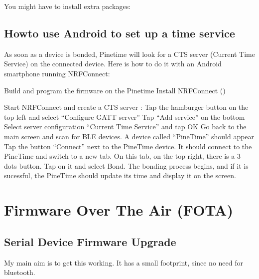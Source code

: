 \documentclass[letterpaper,10pt,english]{sphinxmanual}
\begin{document}
You might have to install extra packages:

\begin{sphinxVerbatim}[commandchars=\\\{\}]
\end{sphinxVerbatim}


\section{Howto use Android to set up a time service}
\label{\detokenize{current-time:howto-use-android-to-set-up-a-time-service}}
As soon as a device is bonded, Pinetime will look for a CTS server (Current Time Service) on the connected device.
Here is how to do it with an Android smartphone running NRFConnect:

Build and program the firmware on the Pinetime Install NRFConnect ()

Start NRFConnect and create a CTS server : Tap the hamburger button on the top left and select “Configure GATT server” Tap “Add service” on the bottom Select server configuration “Current Time Service” and tap OK Go back to the main screen and scan for BLE devices. A device called “PineTime” should appear Tap the button “Connect” next to the PineTime device. It should connect to the PineTime and switch to a new tab. On this tab, on the top right, there is a 3 dots button. Tap on it and select Bond. The bonding process begins, and if it is sucessful, the PineTime should update its time and display it on the screen.


\chapter{Firmware Over The Air (FOTA)}
\label{\detokenize{fota/fota:firmware-over-the-air-fota}}\label{\detokenize{fota/fota:fota}}\label{\detokenize{fota/fota::doc}}

\section{Serial Device Firmware Upgrade}
\label{\detokenize{fota/mcuboot:serial-device-firmware-upgrade}}\label{\detokenize{fota/mcuboot:mcuboot}}\label{\detokenize{fota/mcuboot::doc}}
My main aim is to get this working.
It has a small footprint, since no need for bluetooth.
\end{document}
